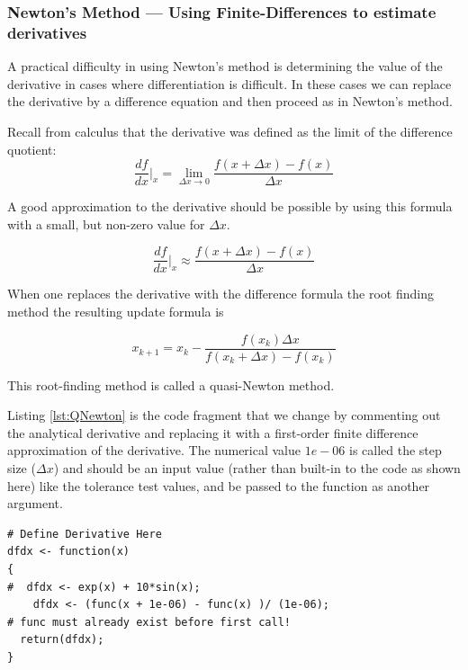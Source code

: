 \subsubsection{Newton's Method --- Using Finite-Differences to estimate derivatives}
A practical difficulty in using Newton's method is determining the value of the derivative in cases where differentiation is difficult.  
In these cases we can replace the derivative by a difference equation and then proceed as in Newton's method. 

Recall from calculus that the derivative was defined as the limit of the difference quotient:
\begin{equation}
\frac{df}{dx}\vert_{x} = \lim_{\Delta x \rightarrow 0}\frac{f(x + \Delta x) - f(x) }{\Delta x}
\end{equation}

A good approximation to the derivative should be possible by using this formula with a small, but non-zero value for $\Delta x$.

\begin{equation}
\frac{df}{dx}\vert_{x} \approx \frac{f(x + \Delta x) - f(x) }{\Delta x}
\end{equation}

When one replaces the derivative with the difference formula the root finding method the resulting update formula is

\begin{equation}
x_{k+1}=x_k - \frac{f(x_k) \Delta x}{f(x_k + \Delta x)-f(x_k)} 
\label{eqn:QuasiNewtonFormula}
\end{equation}

This root-finding method is called a quasi-Newton method.

Listing \ref{lst:QNewton}  is the code fragment that we change by commenting out the analytical derivative and replacing it with a first-order finite difference approximation of the derivative.  
The numerical value $1e-06$ is called the step size ($\Delta x$)  and should be an input value (rather than built-in to the code as shown here) like the tolerance test values, and be passed to the function as another argument.

\begin{lstlisting}[caption=R code demonstrating Newton's Method calculations, label=lst:QNewton]
# Define Derivative Here
dfdx <- function(x)
{
#  dfdx <- exp(x) + 10*sin(x); 
    dfdx <- (func(x + 1e-06) - func(x) )/ (1e-06);
# func must already exist before first call!
  return(dfdx);
}
\end{lstlisting}

